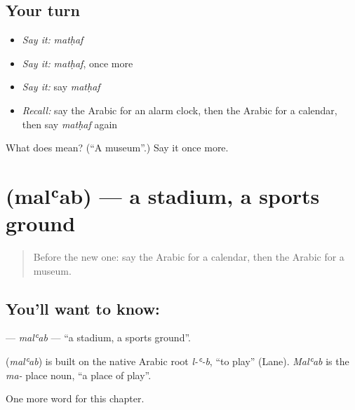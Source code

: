 \subsection*{Your turn}
\begin{itemize}
\raggedright
  \item \emph{Say it:} \emph{matḥaf}
  \item \emph{Say it:} \emph{matḥaf}, once more
  \item \emph{Say it:} say \emph{matḥaf}
  \item \emph{Recall:} say the Arabic for an alarm clock, then the Arabic for a calendar, then say \emph{matḥaf} again
\end{itemize}

\begin{tcolorbox}[breakable,colback=teal!4,colframe=teal!35!black,title={Before you move on}]
What does  mean? (\textquotedblleft{}A museum\textquotedblright{}.) Say it once more.
\end{tcolorbox}
\section[\texorpdfstring{\ar{ملعب} (malʿab)}{ملعب (malʿab)}]{ (malʿab) — a stadium, a sports ground}

\label{lesson:AR-C235-malab}



\begin{quote}
Before the new one: say the Arabic for a calendar, then the Arabic for a museum.
\end{quote}

\subsection*{You'll want to know: }
\textbf{} — \emph{malʿab} — \textquotedblleft{}a stadium, a sports ground\textquotedblright{}.

\begin{cousinweb}
\textbf{} (\emph{malʿab}) is built on the native Arabic root \emph{l-ʿ-b}, \textquotedblleft{}to play\textquotedblright{} (Lane). \emph{Malʿab} is the \emph{ma-} place noun, \textquotedblleft{}a place of play\textquotedblright{}.
\end{cousinweb}

\begin{grammarlens}[title={What you've built}]
One more word for this chapter.
\end{grammarlens}

